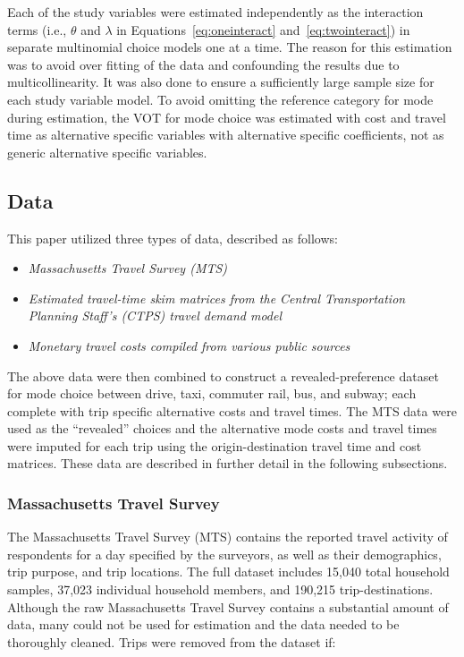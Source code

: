 \documentclass[numbered]{trbunofficial}\usepackage[]{graphicx}\usepackage[]{color}
\begin{document}
Each of the study variables were estimated independently as the interaction terms (i.e., $\theta$ and $\lambda$ in Equations~\eqref{eq:oneinteract} and~\eqref{eq:twointeract}) in separate multinomial choice models one at a time. The reason for this estimation was to avoid over fitting of the data and confounding the results due to multicollinearity. It was also done to ensure a sufficiently large sample size for each study variable model. To avoid omitting the reference category for mode during estimation, the VOT for mode choice was estimated with cost and travel time as alternative specific variables with alternative specific coefficients, not as generic alternative specific variables.

\subsection{Data}\label{sec:data}
This paper utilized three types of data, described as follows:

\begin{itemize}[leftmargin=0.25in, topsep=3pt, itemsep=1pt, parsep=1pt]
\item \emph{Massachusetts Travel Survey (MTS)}
\item \emph{Estimated travel-time skim matrices from the Central Transportation Planning Staff's (CTPS) travel demand model}
\item \emph{Monetary travel costs compiled from various public sources} 
\end{itemize}

\noindent The above data were then combined to construct a revealed-preference dataset for mode choice between drive, taxi, commuter rail, bus, and subway; each complete with trip specific alternative costs and travel times. The MTS data were used as the ``revealed'' choices and the alternative mode costs and travel times were imputed for each trip using the origin-destination travel time and cost matrices. These data are described in further detail in the following subsections.

\subsubsection{Massachusetts Travel Survey}
The Massachusetts Travel Survey (MTS) \citep{MTS2012} contains the reported travel activity of respondents for a day specified by the surveyors, as well as their demographics, trip purpose, and trip locations. The full dataset includes 15,040 total household samples, 37,023 individual household members, and 190,215 trip-destinations. Although the raw Massachusetts Travel Survey contains a substantial amount of data, many could not be used for estimation and the data needed to be thoroughly cleaned. Trips were removed from the dataset if:
\end{document}
